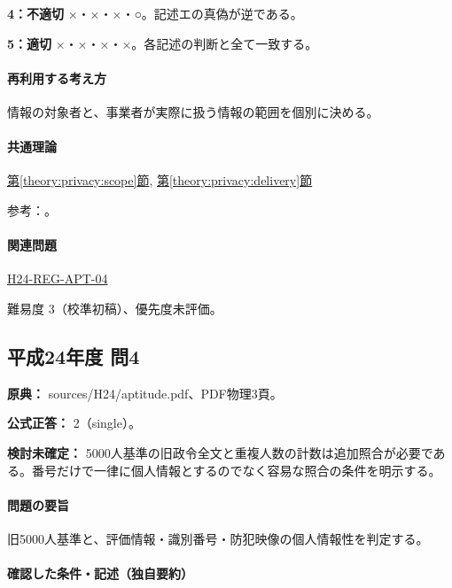 \noindent\textbf{4：不適切} ×・×・×・○。記述エの真偽が逆である。\par

\noindent\textbf{5：適切} ×・×・×・×。各記述の判断と全て一致する。\par

\paragraph{再利用する考え方} 情報の対象者と、事業者が実際に扱う情報の範囲を個別に決める。

\paragraph{共通理論} \hyperref[theory:privacy:scope]{第\ref*{theory:privacy:scope}節}, \hyperref[theory:privacy:delivery]{第\ref*{theory:privacy:delivery}節}

\par 参考：\cite{privacy_general,privacy_delivery}。

\paragraph{関連問題} \hyperref[q:h24-reg-apt-04]{H24-REG-APT-04}

\par 難易度 3（校準初稿）、優先度未評価。

\subsection{平成24年度 問4}
\label{q:h24-reg-apt-04}

\noindent\textbf{原典：} sources/H24/aptitude.pdf、PDF物理3頁。

\textbf{公式正答：} 2（single）。

\par\textbf{検討未確定：} 5000人基準の旧政令全文と重複人数の計数は追加照合が必要である。番号だけで一律に個人情報とするのでなく容易な照合の条件を明示する。

\paragraph{問題の要旨} 旧5000人基準と、評価情報・識別番号・防犯映像の個人情報性を判定する。

\paragraph{確認した条件・記述（独自要約）}\mbox{}\par

